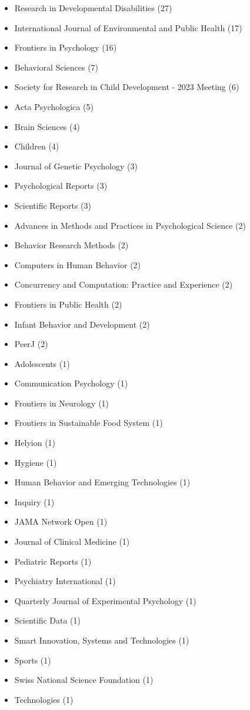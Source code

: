 \documentclass[10pt,a4paper]{altacv}
\begin{document}
\begin{fullwidth}
		\begin{itemize}
			\item Research in Developmental Disabilities (27)
			\item International Journal of Environmental and Public Health (17)
			\item Frontiers in Psychology (16)
			\item Behavioral Sciences (7)
			\item Society for Research in Child Development - 2023 Meeting (6)
			\item Acta Psychologica (5)
			\item Brain Sciences (4)
			\item Children (4)
			\item Journal of Genetic Psychology (3)
			\item Psychological Reports (3)
			\item Scientific Reports (3)
			\item Advances in Methods and Practices in Psychological Science (2)
			\item Behavior Research Methods (2)
			\item Computers in Human Behavior (2)
			\item Concurrency and Computation: Practice and Experience (2)
			\item Frontiers in Public Health (2)
			\item Infant Behavior and Development (2)
			\item PeerJ (2)
			\item Adolescents (1)
            \item Communication Psychology (1)
            \item Frontiers in Neurology (1)
			\item Frontiers in Sustainable Food System (1)
			\item Helyion (1)
			\item Hygiene (1)
			\item Human Behavior and Emerging Technologies (1)
			\item Inquiry (1)
			\item JAMA Network Open (1)
			\item Journal of Clinical Medicine (1)
			\item Pediatric Reports (1)
			\item Psychiatry International (1)
			\item Quarterly Journal of Experimental Psychology (1)
			\item Scientific Data (1)
			\item Smart Innovation, Systems and Technologies (1)
			\item Sports (1)
			\item Swiss National Science Foundation (1)
			\item Technologies (1)
		\end{itemize}
		

\end{fullwidth}
\end{document}
